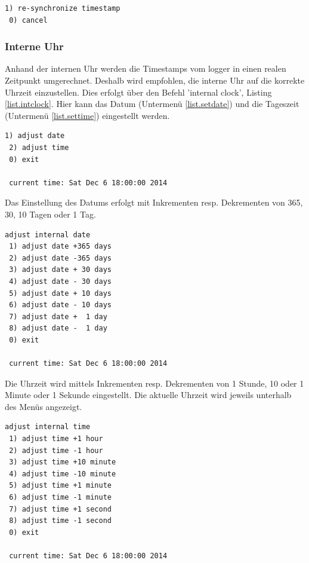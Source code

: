 \begin{lstlisting}[caption=Untermenü Timestamp zurücksetzen, label=list.timestamp]
 1) re-synchronize timestamp
 0) cancel
\end{lstlisting}


\subsubsection{Interne Uhr}\label{sssec.intclock}
Anhand der internen Uhr werden die Timestamps vom \gls{logger} in einen realen Zeitpunkt umgerechnet. Deshalb wird empfohlen, die interne Uhr auf die korrekte Uhrzeit einzustellen. Dies erfolgt über den Befehl 'internal clock', Listing \ref{list.intclock}. Hier kann das Datum (Untermenü \ref{list.setdate}) und die Tageszeit (Untermenü \ref{list.settime}) eingestellt werden.

\begin{lstlisting}[caption=Untermenü interne Uhr, label=list.intclock]
 1) adjust date
 2) adjust time
 0) exit

 current time: Sat Dec 6 18:00:00 2014
\end{lstlisting}

Das Einstellung des Datums erfolgt mit Inkrementen resp. Dekrementen von 365, 30, 10 Tagen oder 1 Tag.

\begin{lstlisting}[caption=Untermenü Datum einstellen, label=list.setdate]
adjust internal date
 1) adjust date +365 days
 2) adjust date -365 days
 3) adjust date + 30 days
 4) adjust date - 30 days
 5) adjust date + 10 days
 6) adjust date - 10 days
 7) adjust date +  1 day
 8) adjust date -  1 day
 0) exit

 current time: Sat Dec 6 18:00:00 2014
\end{lstlisting}

Die Uhrzeit wird mittels Inkrementen resp. Dekrementen von 1 Stunde, 10 oder 1 Minute oder 1 Sekunde eingestellt. Die aktuelle Uhrzeit wird jeweils unterhalb des Menüs angezeigt.

\begin{lstlisting}[caption=Untermenü Uhrzeit einstellen, label=list.settime]
adjust internal time
 1) adjust time +1 hour
 2) adjust time -1 hour
 3) adjust time +10 minute
 4) adjust time -10 minute
 5) adjust time +1 minute
 6) adjust time -1 minute
 7) adjust time +1 second
 8) adjust time -1 second
 0) exit

 current time: Sat Dec 6 18:00:00 2014
\end{lstlisting}


